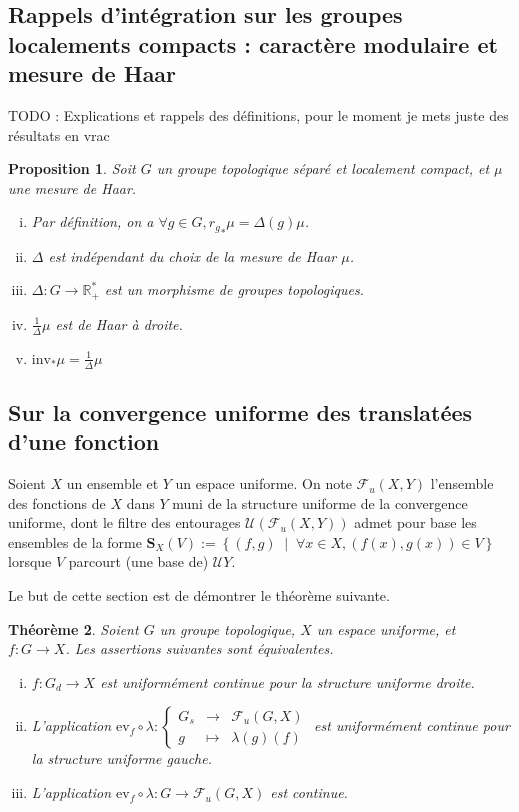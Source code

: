 \documentclass[a4paper,12pt]{article}
\newtheorem{theorem}{Théorème}[section]
\newtheorem{proposition}[theorem]{Proposition}
\newcommand{\R}{\mathbb{R}}
\newcommand{\ev}{\mathrm{ev}}
\newcommand{\set}[1]{\left\{ #1 \right\}}
\newcommand\fundef[3]{#1: \left\{\begin{array}{ccc}#2\\#3\end{array}\right.}
\newcommand{\tq}{\;\middle|\;}
\newcommand{\comp}{\circ}
\newcommand{\invop}{\mathrm{inv}}
\newcommand{\TODO}[1]{{\color{red}TODO :} #1}
\begin{document}
\subsection*{Rappels d'intégration sur les groupes localements compacts : caractère modulaire et mesure de Haar}

\TODO{Explications et rappels des définitions, pour le moment je mets juste des résultats en vrac}

\begin{proposition}\label{modular_character}
    Soit $G$ un groupe topologique séparé et localement compact, et $\mu$ une mesure de Haar.
    \begin{enumerate}[(i)]
        \item\label{modular_character/def} Par définition, on a $\forall g\in G, {r_g}_*\mu = \Delta(g)\mu$.
        \item\label{modular_character/indep} $\Delta$ est indépendant du choix de la mesure de Haar $\mu$.
        \item\label{modular_character/continuous_group_hom} $\Delta:G\to\R_+^*$ est un morphisme de groupes topologiques.
        \item\label{modular_character/right_haar} $\frac{1}{\Delta}\mu$ est de Haar à droite.
        \item\label{modular_character/inv_change_of_variable} $\invop_*\mu = \frac{1}{\Delta}\mu$
    \end{enumerate}
\end{proposition}

\subsection*{Sur la convergence uniforme des translatées d'une fonction}

Soient $X$ un ensemble et $Y$ un espace uniforme. On note $\mathcal{F}_u(X, Y)$ l'ensemble des 
fonctions de $X$ dans $Y$ muni de la structure uniforme de la convergence uniforme, dont le filtre des entourages 
$\mathcal{U}(\mathcal{F}_u(X, Y))$ admet pour base les ensembles de la forme 
$\mathbf{S}_X(V) := \set{(f, g)\tq\forall x\in X, (f(x),g(x))\in V}$ lorsque $V$ parcourt (une base de) $\mathcal{U}Y$.

Le but de cette section est de démontrer le théorème suivante.
\begin{theorem}\label{uniform_continuous_iff_postcomp}
    Soient $G$ un groupe topologique, $X$ un espace uniforme, et $f:G\to X$. Les assertions suivantes sont équivalentes.
    \begin{enumerate}[(i)]
        \item $f:G_d\to X$ est uniformément continue \emph{pour la structure uniforme droite}.
        \item L'application $\fundef{\ev_f\comp\lambda}{G_s&\to&\mathcal{F}_u(G,X)}{g&\mapsto&\lambda(g)(f)}$ est uniformément continue
            \emph{pour la structure uniforme gauche}.
        \item L'application $\ev_f\comp\lambda:G\to\mathcal{F}_u(G,X)$ est continue.
    \end{enumerate}
\end{theorem}
\end{document}
